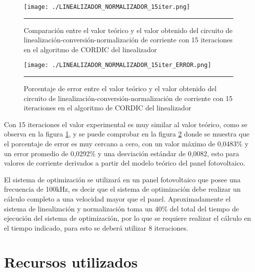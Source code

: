 \begin{figure}[H]
  \centering
    \texttt{[image: ./LINEALIZADOR\_NORMALIZADOR\_15iter.png]}
    \rule{35em}{0.5pt}
  \caption[Comparación entre el valor teórico y el valor obtenido del circuito de linealización-conversión-normalización de corriente con 15 iteraciones en el algoritmo de CORDIC del linealizador]{Comparación entre el valor teórico y el valor obtenido del circuito de linealización-conversión-normalización de corriente con 15 iteraciones en el algoritmo de CORDIC del linealizador}
  \label{fig:LIN_NOR_15}
\end{figure}

\begin{figure}[H]
  \centering
    \texttt{[image: ./LINEALIZADOR\_NORMALIZADOR\_15iter\_ERROR.png]}
    \rule{35em}{0.5pt}
  \caption[Porcentaje de error entre el valor teórico y el valor obtenido del circuito de linealización-conversión-normalización de corriente con 15 iteraciones en el algoritmo de CORDIC del linealizador]{Porcentaje de error entre el valor teórico y el valor obtenido del circuito de linealización-conversión-normalización de corriente con 15 iteraciones en el algoritmo de CORDIC del linealizador}
  \label{fig:LIN_NOR_15_E}
\end{figure}

Con 15 iteraciones el valor experimental es muy similar al valor teórico, como se observa en la figura \ref{fig:LIN_NOR_15}, y se puede comprobar en la figura \ref{fig:LIN_NOR_15_E} donde se muestra que el porcentaje de error es muy cercano a cero, con un valor máximo de 0,0483\% y un error promedio de 0,0292\% y una desviación estándar de 0,0082, esto para valores de corriente derivados a partir del modelo teórico del panel fotovoltaico.

El sistema de optimización se utilizará en un panel fotovoltaico que posee una frecuencia de 100kHz, es decir que el sistema de optimización debe realizar un cálculo completo a una velocidad mayor que el panel. Aproximadamente el sistema de linealización y normalización toma un 40\% del total del tiempo de ejecución del sistema de optimización, por lo que se requiere realizar el cálculo en el tiempo indicado, para esto se deberá utilizar 8 iteraciones.    

\newpage 

\section{Recursos utilizados}


